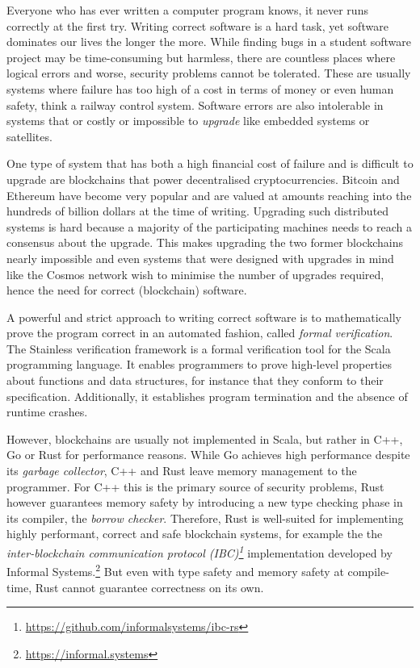 Everyone who has ever written a computer program knows, it never runs correctly
at the first try. Writing correct software is a hard task, yet software
dominates our lives the longer the more. While finding bugs in a student
software project may be time-consuming but harmless, there are countless places
where logical errors and worse, security problems cannot be tolerated. These are
usually systems where failure has too high of a cost in terms of money or even
human safety, think a railway control system. Software errors are also
intolerable in systems that or costly or impossible to \emph{upgrade} like
embedded systems or satellites.

One type of system that has both a high financial cost of failure and is
difficult to upgrade are blockchains that power decentralised cryptocurrencies.
Bitcoin \cite{bitcoin} and Ethereum \cite{ethereum} have become very popular and
are valued at amounts reaching into the hundreds of billion dollars at the time
of writing. Upgrading such distributed systems is hard because a majority of the
participating machines needs to reach a consensus about the upgrade. This makes
upgrading the two former blockchains nearly impossible and even systems that
were designed with upgrades in mind like the Cosmos network \cite{cosmos} wish
to minimise the number of upgrades required, hence the need for correct
(blockchain) software.

A powerful and strict approach to writing correct software is to mathematically
prove the program correct in an automated fashion, called \emph{formal
verification}. The Stainless verification framework \cite{stainless} is a formal
verification tool for the Scala programming language. It enables programmers to
prove high-level properties about functions and data structures, for instance
that they conform to their specification. Additionally, it establishes program
termination and the absence of runtime crashes.

However, blockchains are usually not implemented in Scala, but rather in C++, Go
or Rust for performance reasons. While Go achieves high performance despite its
\emph{garbage collector}, C++ and Rust leave memory management to the
programmer. For C++ this is the primary source of security problems, Rust
however guarantees memory safety by introducing a new type checking phase in its
compiler, the \emph{borrow checker}. Therefore, Rust is well-suited for
implementing highly performant, correct and safe blockchain systems, for example
the  the \emph{inter-blockchain communication protocol
(IBC)\footnote{\url{https://github.com/informalsystems/ibc-rs}}} implementation
developed by Informal Systems.\footnote{\url{https://informal.systems}} But even
with type safety and memory safety at compile-time, Rust cannot guarantee
correctness on its own.

